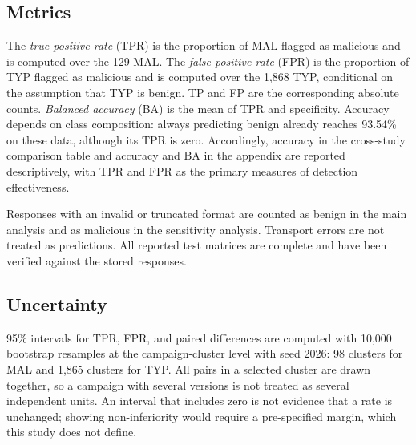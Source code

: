 \documentclass[a4paper,fleqn]{cas-dc}
\begin{document}
\subsection{Metrics}
The \emph{true positive rate} (TPR) is the proportion of MAL flagged as malicious
and is computed over the 129 MAL. The \emph{false positive rate} (FPR) is the
proportion of TYP flagged as malicious and is computed over the 1,868 TYP,
conditional on the assumption that TYP is benign. TP and FP are the corresponding
absolute counts. \emph{Balanced accuracy} (BA) is the mean of TPR and
specificity. Accuracy depends on class composition: always predicting benign
already reaches 93.54\% on these data, although its TPR is zero. Accordingly,
accuracy in the cross-study comparison table and accuracy and BA in the appendix
are reported descriptively, with TPR and FPR as the primary measures of detection
effectiveness.

Responses with an invalid or truncated format are counted as benign in the main
analysis and as malicious in the sensitivity analysis. Transport errors are not
treated as predictions. All reported test matrices are complete and have been
verified against the stored responses.

\subsection{Uncertainty}
95\% intervals for TPR, FPR, and paired differences are computed with 10,000
bootstrap resamples at the campaign-cluster level with seed 2026: 98 clusters for
MAL and 1,865 clusters for TYP. All pairs in a selected cluster are drawn
together, so a campaign with several versions is not treated as several
independent units. An interval that includes zero is not evidence that a rate is unchanged; showing
non-inferiority would require a pre-specified margin, which this study does not
define.
\end{document}
